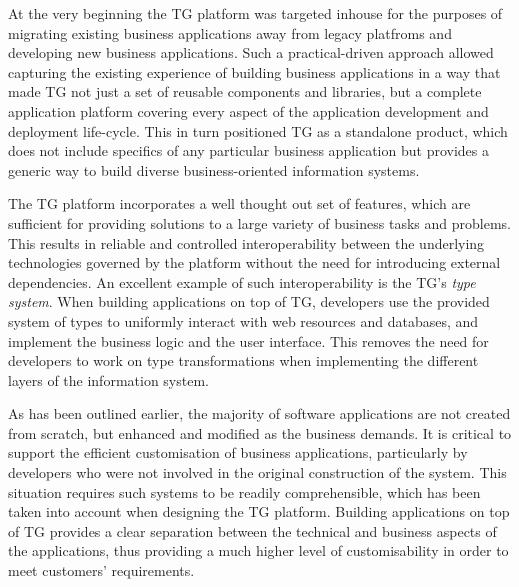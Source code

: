   At the very beginning the TG platform was targeted inhouse for the purposes of migrating existing business applications away from legacy platfroms and developing new business applications.
  Such a practical-driven approach allowed capturing the existing experience of building business applications in a way that made TG not just a set of reusable components and libraries, but a complete application platform covering every aspect of the application development and deployment life-cycle.
  This in turn positioned TG as a standalone product, which does not include specifics of any particular business application but provides a generic way to build diverse business-oriented information systems.

  The TG platform incorporates a well thought out set of features, which are sufficient for providing solutions to a large variety of business tasks and problems.
  This results in reliable and controlled interoperability between the underlying technologies governed by the platform without the need for introducing external dependencies.
  An excellent example of such interoperability is the TG's \emph{type system}.
  When building applications on top of TG, developers use the provided system of types to uniformly interact with web resources and databases, and implement the business logic and the user interface.
  This removes the need for developers to work on type transformations when implementing the different layers of the information system.
  
  As has been outlined earlier, the majority of software applications are not created from scratch, but enhanced and modified as the business demands.
  It is critical to support the efficient customisation of business applications, particularly by developers who were not involved in the original construction of the system.
  This situation requires such systems to be readily comprehensible, which has been taken into account when designing the TG platform.
  Building applications on top of TG provides a clear separation between the technical and business aspects of the applications, thus providing a much higher level of customisability in order to meet customers' requirements.